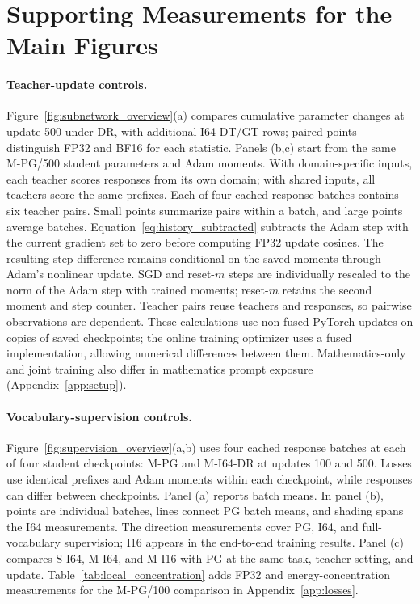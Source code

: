 \section{Supporting Measurements for the Main Figures}
\label{app:nine_panel_support}


\paragraph{Teacher-update controls.}
Figure~\ref{fig:subnetwork_overview}(a) compares cumulative parameter changes at update 500 under DR, with additional I64-DT/GT rows; paired points distinguish FP32 and BF16 for each statistic. Panels (b,c) start from the same M-PG/500 student parameters and Adam moments. With domain-specific inputs, each teacher scores responses from its own domain; with shared inputs, all teachers score the same prefixes. Each of four cached response batches contains six teacher pairs. Small points summarize pairs within a batch, and large points average batches. Equation~\ref{eq:history_subtracted} subtracts the Adam step with the current gradient set to zero before computing FP32 update cosines. The resulting step difference remains conditional on the saved moments through Adam's nonlinear update. SGD and reset-$m$ steps are individually rescaled to the norm of the Adam step with trained moments; reset-$m$ retains the second moment and step counter. Teacher pairs reuse teachers and responses, so pairwise observations are dependent. These calculations use non-fused PyTorch updates on copies of saved checkpoints; the online training optimizer uses a fused implementation, allowing numerical differences between them. Mathematics-only and joint training also differ in mathematics prompt exposure (Appendix~\ref{app:setup}).

\paragraph{Vocabulary-supervision controls.}
Figure~\ref{fig:supervision_overview}(a,b) uses four cached response batches at each of four student checkpoints: M-PG and M-I64-DR at updates 100 and 500. Losses use identical prefixes and Adam moments within each checkpoint, while responses can differ between checkpoints. Panel (a) reports batch means. In panel (b), points are individual batches, lines connect PG batch means, and shading spans the I64 measurements. The direction measurements cover PG, I64, and full-vocabulary supervision; I16 appears in the end-to-end training results. Panel (c) compares S-I64, M-I64, and M-I16 with PG at the same task, teacher setting, and update. Table~\ref{tab:local_concentration} adds FP32 and energy-concentration measurements for the M-PG/100 comparison in Appendix~\ref{app:losses}.

